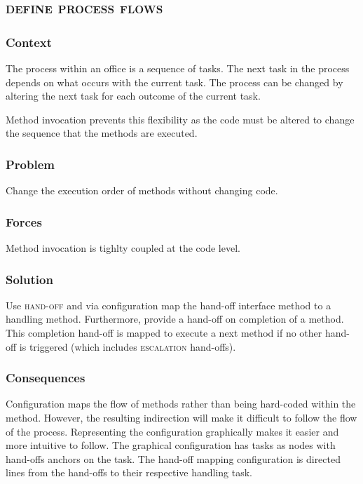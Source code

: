 \documentclass[prodmode]{style/acmlarge}
\begin{document}
\subsection{\textsc{\textbf{define process flows}}}

\subsubsection*{Context} The process within an office is a sequence of tasks.
The next task in the process depends on what occurs with the current task.  The
process can be changed by altering the next task for each outcome of the current
task.

Method invocation prevents this flexibility as the code must be altered to
change the sequence that the methods are executed.

\subsubsection*{Problem} Change the execution order of methods without changing
code.

\subsubsection*{Forces} Method invocation is tighlty coupled at the code level.

\subsubsection*{Solution} Use \textsc{hand-off} and via configuration map the
hand-off interface method to a handling method.  Furthermore, provide a hand-off
on completion of a method.  This completion hand-off is mapped to execute a next
method if no other hand-off is triggered (which includes \textsc{escalation}
hand-offs).

\subsubsection*{Consequences} Configuration maps the flow of methods rather than
being hard-coded within the method.  However, the resulting indirection will
make it difficult to follow the flow of the process.  Representing the
configuration graphically makes it easier and more intuitive to follow.  The
graphical configuration has tasks as nodes with hand-offs anchors on the task. 
The hand-off mapping configuration is directed lines from the hand-offs to their
respective handling task.
\end{document}
